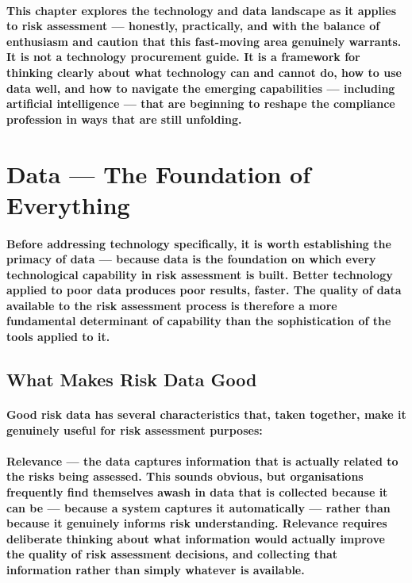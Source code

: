 \paragraph{This chapter explores the technology and data landscape as it applies to risk assessment — honestly, practically, and with the balance of enthusiasm and caution that this fast-moving area genuinely warrants. It is not a technology procurement guide. It is a framework for thinking clearly about what technology can and cannot do, how to use data well, and how to navigate the emerging capabilities — including artificial intelligence — that are beginning to reshape the compliance profession in ways that are still unfolding.}

\section{Data — The Foundation of Everything}
\paragraph{Before addressing technology specifically, it is worth establishing the primacy of data — because data is the foundation on which every technological capability in risk assessment is built. Better technology applied to poor data produces poor results, faster. The quality of data available to the risk assessment process is therefore a more fundamental determinant of capability than the sophistication of the tools applied to it.}

\subsection{What Makes Risk Data Good}
\paragraph{Good risk data has several characteristics that, taken together, make it genuinely useful for risk assessment purposes:}
\paragraph{\textbf{Relevance} — the data captures information that is actually related to the risks being assessed. This sounds obvious, but organisations frequently find themselves awash in data that is collected because it can be — because a system captures it automatically — rather than because it genuinely informs risk understanding. Relevance requires deliberate thinking about what information would actually improve the quality of risk assessment decisions, and collecting that information rather than simply whatever is available.}
